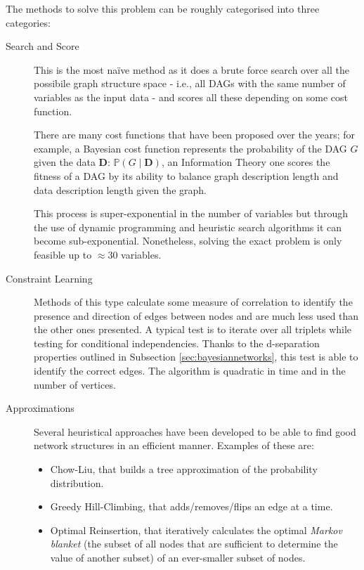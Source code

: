 The methods to solve this problem can be roughly categorised into three categories:
\begin{description}
	\item[Search and Score] This is the most na{\"i}ve method as it does a brute force search over all the possibile graph structure space - i.e., all DAGs with the same number of variables as the input data - and scores all these depending on some cost function.
	
	There are many cost functions that have been proposed over the years; for example, a Bayesian cost function represents the probability of the DAG $G$ given the data $\boldsymbol{D}$: $\mathbb{P}(G \mid \boldsymbol{D})$, an Information Theory one scores the fitness of a DAG by its ability to balance graph description length and data description length given the graph. 
	
		This process is super-exponential in the number of variables but through the use of dynamic programming and heuristic search algorithms it can become sub-exponential.
		Nonetheless, solving the exact problem is only feasible up to $\approx 30$ variables.
	\item[Constraint Learning] Methods of this type calculate some measure of correlation to identify the presence and direction of edges between nodes and are much less used than the other ones presented.
		A typical test is to iterate over all triplets while testing for conditional independencies.
		Thanks to the d-separation properties outlined in Subsection \ref{sec:bayesiannetworks}, this test is able to identify the correct edges.
		The algorithm is quadratic in time and in the number of vertices.
	\item[Approximations] Several heuristical approaches have been developed to be able to find good network structures in an efficient manner.
		Examples of these are:
		\begin{itemize}
		  \item Chow-Liu, that builds a tree approximation of the probability distribution.
		  \item Greedy Hill-Climbing, that adds/removes/flips an edge at a time.
		  \item Optimal Reinsertion, that iteratively calculates the optimal \textit{Markov blanket} (the subset of all nodes that are sufficient to determine the value of another subset) of an ever-smaller subset of nodes.
		\end{itemize}
\end{description}

